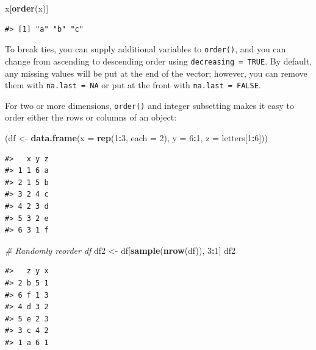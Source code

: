 \documentclass[]{book}
\newenvironment{Shaded}{\begin{snugshade}}{\end{snugshade}}
\newcommand{\KeywordTok}[1]{\textcolor[rgb]{0.13,0.29,0.53}{\textbf{#1}}}
\newcommand{\DataTypeTok}[1]{\textcolor[rgb]{0.13,0.29,0.53}{#1}}
\newcommand{\DecValTok}[1]{\textcolor[rgb]{0.00,0.00,0.81}{#1}}
\newcommand{\StringTok}[1]{\textcolor[rgb]{0.31,0.60,0.02}{#1}}
\newcommand{\CommentTok}[1]{\textcolor[rgb]{0.56,0.35,0.01}{\textit{#1}}}
\newcommand{\OperatorTok}[1]{\textcolor[rgb]{0.81,0.36,0.00}{\textbf{#1}}}
\newcommand{\NormalTok}[1]{#1}
\theoremstyle{definition}
\theoremstyle{definition}
\theoremstyle{definition}
\theoremstyle{remark}
\begin{document}
\begin{Shaded}
\begin{Highlighting}[]
\NormalTok{x[}\KeywordTok{order}\NormalTok{(x)]}
\end{Highlighting}
\end{Shaded}

\begin{verbatim}
#> [1] "a" "b" "c"
\end{verbatim}

To break ties, you can supply additional variables to \texttt{order()},
and you can change from ascending to descending order using
\texttt{decreasing\ =\ TRUE}. By default, any missing values will be put
at the end of the vector; however, you can remove them with
\texttt{na.last\ =\ NA} or put at the front with
\texttt{na.last\ =\ FALSE}.

For two or more dimensions, \texttt{order()} and integer subsetting
makes it easy to order either the rows or columns of an object:

\begin{Shaded}
\begin{Highlighting}[]
\NormalTok{(df <-}\StringTok{ }\KeywordTok{data.frame}\NormalTok{(}\DataTypeTok{x =} \KeywordTok{rep}\NormalTok{(}\DecValTok{1}\OperatorTok{:}\DecValTok{3}\NormalTok{, }\DataTypeTok{each =} \DecValTok{2}\NormalTok{), }\DataTypeTok{y =} \DecValTok{6}\OperatorTok{:}\DecValTok{1}\NormalTok{, }\DataTypeTok{z =}\NormalTok{ letters[}\DecValTok{1}\OperatorTok{:}\DecValTok{6}\NormalTok{]))}
\end{Highlighting}
\end{Shaded}

\begin{verbatim}
#>   x y z
#> 1 1 6 a
#> 2 1 5 b
#> 3 2 4 c
#> 4 2 3 d
#> 5 3 2 e
#> 6 3 1 f
\end{verbatim}

\begin{Shaded}
\begin{Highlighting}[]
\CommentTok{# Randomly reorder df}
\NormalTok{df2 <-}\StringTok{ }\NormalTok{df[}\KeywordTok{sample}\NormalTok{(}\KeywordTok{nrow}\NormalTok{(df)), }\DecValTok{3}\OperatorTok{:}\DecValTok{1}\NormalTok{]}
\NormalTok{df2}
\end{Highlighting}
\end{Shaded}

\begin{verbatim}
#>   z y x
#> 2 b 5 1
#> 6 f 1 3
#> 4 d 3 2
#> 5 e 2 3
#> 3 c 4 2
#> 1 a 6 1
\end{verbatim}
\end{document}

